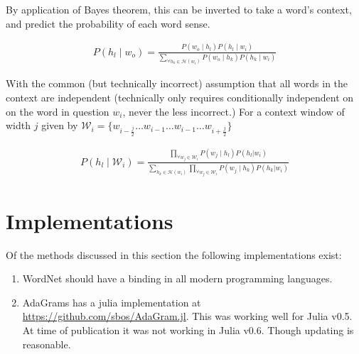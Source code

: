 \documentclass[12pt,parskip]{komatufte}
\begin{document}
By application of Bayes theorem, this can be inverted to take a word's context,
and predict the probability of each word sense.

\begin{align}
P(h_l \mid w_o) = \frac{P(w_o \mid h_l) P(h_l \mid w_i)}{\sum_{\forall h_k \in \mathcal{H}(w_i)} P(w_o \mid h_k) P(h_k \mid w_i)}
\end{align}

With the common (but technically incorrect) assumption that all words in the context are independent (technically only requires conditionally independent on on the word in question $w_i$, never the less incorrect.)
For a context window of width $j$ given by $\mathcal{W}_i = \lbrace w_{i-\frac{j}{2}} \ldots w_{i-1} \ldots w_{i-1} \dots w_{i+\frac{j}{2}} \rbrace$

\begin{align}
P(h_l \mid \mathcal{W}_i) = 
\frac{\prod_{\forall w_{j}\in \mathcal{W}_i} P(w_{j} \mid h_l) P(h_l | w_i)}{\sum_{h_k \in \mathcal{H}(w_i)} \prod_{\forall w_{j} \in \mathcal{W}_i} P(w_{j} \mid h_k) P(h_k | w_i)}
\end{align}


\section{Implementations}
Of the methods discussed in this section the following implementations exist:
\begin{enumerate}
	\item WordNet \parencite{tengi1998design} should have a binding in all modern programming languages.
	\item AdaGrams \parencite{AdaGrams} has a julia implementation at \url{https://github.com/sbos/AdaGram.jl}. This was working well for Julia v0.5. At time of publication it was not working in Julia v0.6. Though updating is reasonable.
\end{enumerate}
\end{document}
